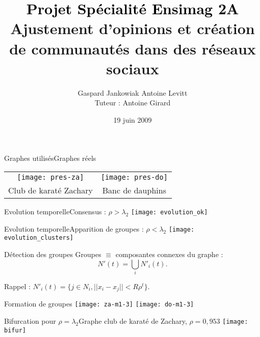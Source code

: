 \documentclass{beamer}
\author{Gaspard Jankowiak \quad Antoine Levitt\\ Tuteur : Antoine Girard}
\title{{\textbf{\textcolor{black}{Projet Spécialité Ensimag 2A}}}\vspace{1cm}\\ {Ajustement d'opinions et création de communautés dans des réseaux
sociaux}}
\date{19 juin 2009}
\begin{document}
\begin{frame}
	\maketitle
\end{frame}

\begin{frame}{Graphes utilisés}{Graphes réels}
	\begin{center}
		\begin{tabular}[h]{cc}
			\texttt{[image: pres-za]}&
			\texttt{[image: pres-do]}
			\\
			Club de karaté Zachary & Banc de dauphins
		\end{tabular}
	\end{center}
\end{frame}

\begin{frame}{Evolution temporelle}{Consensus : $\rho > \lambda_2$} 
	\texttt{[image: evolution\_ok]}
\end{frame}
\begin{frame}{Evolution temporelle}{Apparition de groupes : $\rho < \lambda_2$}
	\texttt{[image: evolution\_clusters]}
\end{frame}

\begin{frame}{Détection des groupes}
	Groupes $\equiv$ composantes connexes du graphe :
	$$N'(t)=\bigcup_i N'_i(t).$$

	Rappel : $N'_i(t) = \{j \in N_i, ||x_i - x_j|| < R \rho^t\}.$
\end{frame}

\begin{frame}{Formation de groupes}
	\texttt{[image: za-m1-3]}
	\texttt{[image: do-m1-3]}
\end{frame}

\begin{frame}{Bifurcation pour $\rho = \lambda_2$}{Graphe club de karaté de Zachary, $\rho = 0,953$}
	\texttt{[image: bifur]}
\end{frame}
\end{document}
